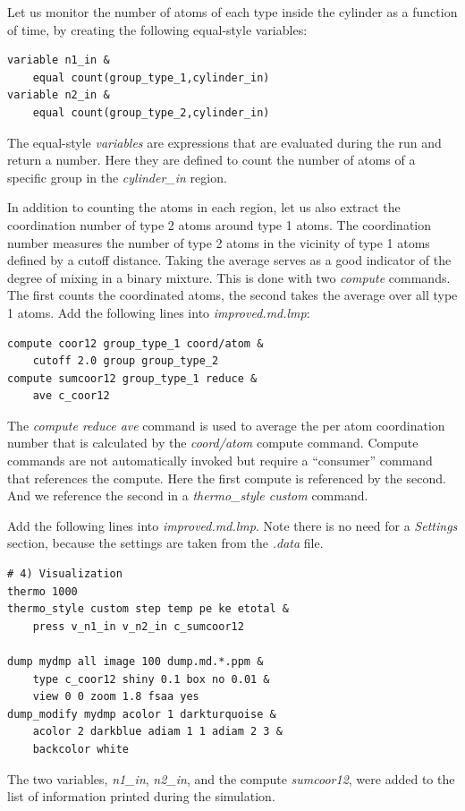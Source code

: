 \documentclass[9pt,tutorial]{livecoms}
\begin{document}
Let us monitor the number of atoms of each type inside the cylinder as a
function of time, by creating the following equal-style variables:
{\normalsize
\begin{verbatim}
variable n1_in &
    equal count(group_type_1,cylinder_in)
variable n2_in &
    equal count(group_type_2,cylinder_in)
\end{verbatim}
}
The equal-style \textit{variables} are expressions that are evaluated
during the run and return a number.  Here they are defined to count
the number of atoms of a specific group in the \textit{cylinder\_in} region.

In addition to counting the atoms in each region, let us also extract
the coordination number of type 2 atoms around type 1 atoms.  The
coordination number measures the number of type 2 atoms in the vicinity
of type 1 atoms defined by a cutoff distance.  Taking the average serves
as a good indicator of the degree of mixing in a binary mixture.  This
is done with two \textit{compute} commands.  The first counts the
coordinated atoms, the second takes the average over all type 1
atoms. Add the following lines into \textit{improved.md.lmp}:
{\normalsize
\begin{verbatim}
compute coor12 group_type_1 coord/atom &
    cutoff 2.0 group group_type_2
compute sumcoor12 group_type_1 reduce &
    ave c_coor12
\end{verbatim}
}
The \textit{compute reduce ave} command is used to average the per atom
coordination number that is calculated by the \textit{coord/atom}
compute command.  Compute commands are not automatically invoked but
require a ``consumer'' command that references the compute.  Here the
first compute is referenced by the second.  And we reference the second
in a \textit{thermo\_style custom} command.

Add the following lines into \textit{improved.md.lmp}.  Note there is no
need for a \textit{Settings} section, because the settings are taken
from the \textit{.data} file.
{\normalsize
\begin{verbatim}
# 4) Visualization
thermo 1000
thermo_style custom step temp pe ke etotal &
    press v_n1_in v_n2_in c_sumcoor12

dump mydmp all image 100 dump.md.*.ppm &
    type c_coor12 shiny 0.1 box no 0.01 &
    view 0 0 zoom 1.8 fsaa yes
dump_modify mydmp acolor 1 darkturquoise &
    acolor 2 darkblue adiam 1 1 adiam 2 3 &
    backcolor white
\end{verbatim}
}
The two variables, \textit{n1\_in}, \textit{n2\_in}, and the compute
\textit{sumcoor12}, were added to the list of information printed during
the simulation.
\end{document}
